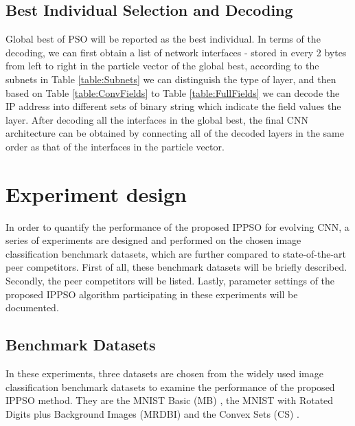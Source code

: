\documentclass[conference]{IEEEtran}
\begin{document}
\subsection{Best Individual Selection and Decoding}

Global best of PSO will be reported as the best individual. In terms of the decoding, we can first obtain a list of network interfaces - stored in every 2 bytes from left to right in the particle vector of the global best, according to the subnets in Table \ref{table:Subnets} we can distinguish the type of layer, and then based on Table \ref{table:ConvFields} to Table \ref{table:FullFields} we can decode the IP address into different sets of binary string which indicate the field values the layer. After decoding all the interfaces in the global best, the final CNN architecture can be obtained by connecting all of the decoded layers in the same order as that of the interfaces in the particle vector.

\section{Experiment design}\label{sec:EPDesign}

In order to quantify the performance of the proposed IPPSO for evolving CNN, a series of experiments are designed and performed on the chosen image classification benchmark datasets, which are further compared to state-of-the-art peer competitors. First of all, these benchmark datasets will be briefly described. Secondly, the peer competitors will be listed. Lastly, parameter settings of the proposed IPPSO algorithm participating in these experiments will be documented.

\subsection{Benchmark Datasets}

In these experiments, three datasets are chosen from the widely used image classification benchmark datasets to examine the performance of the proposed IPPSO method. They are the MNIST Basic (MB) \cite{DeepArchitectureEval:Larochelle}, the MNIST with Rotated Digits plus Background Images (MRDBI) \cite{DeepArchitectureEval:Larochelle} and the Convex Sets (CS) \cite{DeepArchitectureEval:Larochelle}. 
\end{document}

